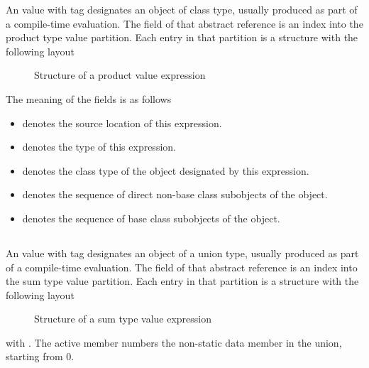 An  value with tag  designates an object of class type, usually produced as part of a compile-time evaluation.
The  field of that abstract reference is an index into the product type value partition.  Each entry in that partition is a structure with the following layout
%
\begin{figure}[H]
	\centering
	\caption{Structure of a product value expression}
	\label{fig:ifc-product-value-structure}
\end{figure}
%
The meaning of the fields is as follows
\begin{itemize}
	\item {} denotes the source location of this expression.
	\item {} denotes the type of this expression.
	\item {} denotes the class type of the object designated by this expression.
	\item {} denotes the sequence of direct non-base class subobjects of the object.
	\item {} denotes the sequence of base class subobjects of the object.
\end{itemize}



\subsection{}
\label{sec:ifc:ExprSort:SumTypeValue}

An  value with tag  designates an object of a union type, usually produced as part of a compile-time evaluation.
The  field of that abstract reference is an index into the sum type value partition.  Each entry in that partition is a structure with the following layout
%
\begin{figure}[H]
	\centering
	\caption{Structure of a sum type value expression}
	\label{fig:ifc:ExprSort:SumTypeValue}
\end{figure}
%
with .  The active member numbers the non-static data member in the union, starting from $0$.


